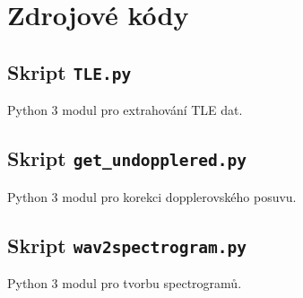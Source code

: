 \chapter{Zdrojové kódy}

  \section{Skript \texttt{TLE.py}}

    Python 3 modul pro extrahování TLE dat.
    

  \section{Skript \texttt{get\_undopplered.py}}

    Python 3 modul pro korekci dopplerovského posuvu.
    

  \section{Skript \texttt{wav2spectrogram.py}}

    Python 3 modul pro tvorbu spectrogramů.
    
